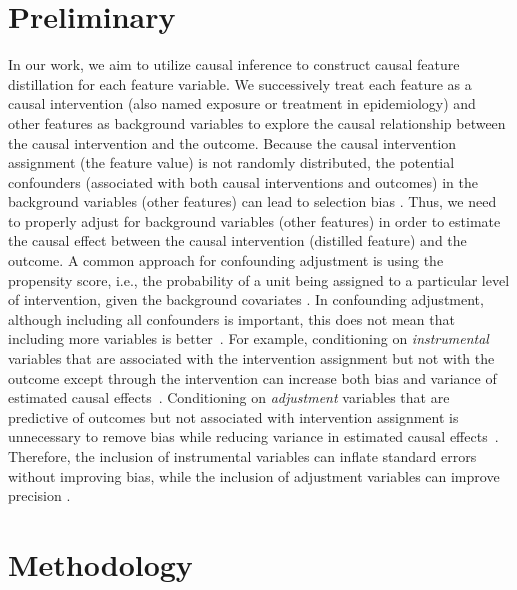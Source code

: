 \documentclass[letterpaper]{article} %
\theoremstyle{definition}
\theoremstyle{remark}
\begin{document}
\section{Preliminary}
\label{PS}


In our work, we aim to utilize causal inference to construct causal feature distillation for each feature variable. We successively treat each feature as a causal intervention (also named exposure or treatment in epidemiology) and other features as background variables to explore the causal relationship between the causal intervention and the outcome. Because the causal intervention assignment (the feature value) is not randomly distributed, the potential confounders (associated with both causal interventions and outcomes) in the background variables (other features) can lead to selection bias \cite{chu2023causal,yao2021survey,li2023machine,chu2021graph}. Thus, we need to properly adjust for background variables (other features) in order to estimate the causal effect between the causal intervention (distilled feature) and the outcome. A common approach for confounding adjustment is using the propensity score, i.e., the probability of a unit being assigned to a particular level of intervention, given the background covariates \cite{rosenbaum1983central}. In confounding adjustment, although including all confounders is important, this does not mean that including more variables is better~\cite{chu2020matching,greenland2008invited,schisterman2009overadjustment}. For example, conditioning on \textit{instrumental} variables that are associated with the intervention assignment but not with the outcome except through the intervention can increase both bias and variance of estimated causal effects~\cite{myers2011effects_instrumental}. Conditioning on \textit{adjustment} variables that are predictive of outcomes but not associated with intervention assignment is unnecessary to remove bias while reducing variance in estimated causal effects~\cite{sauer2013review}. Therefore, the inclusion of instrumental variables can inflate standard errors without improving bias, while the inclusion of adjustment variables can improve precision \cite{shortreed2017outcome,wilson2014confounder,lin2015regularization}.




\section{Methodology}
\end{document}
